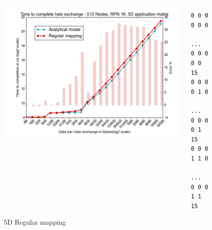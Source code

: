 \documentclass{beamer}
\begin{document}
\begin{frame}[fragile]
\begin{figure}
\caption{5D Regular mapping}
\begin{columns}
  \begin{column}{0.6\textwidth}
    \includegraphics[width=1\textwidth]{../mappings/5d_regular_model.png}
  \end{column}
  \begin{column}{0.3\textwidth}
\lstset{title=Mapping sample}
\begin{lstlisting}[basicstyle=\footnotesize\ttfamily, frame=lines,columns=fixed]
0 0 0 0 0 0
    ...
0 0 0 0 0 15
0 0 0 0 1 0
    ...
0 0 0 0 1 15
0 0 0 1 1 0
    ...
0 0 0 1 1 15
\end{lstlisting}
  \end{column}
\end{columns}
\end{figure}
\end{frame}
\iffalse
\end{document}
